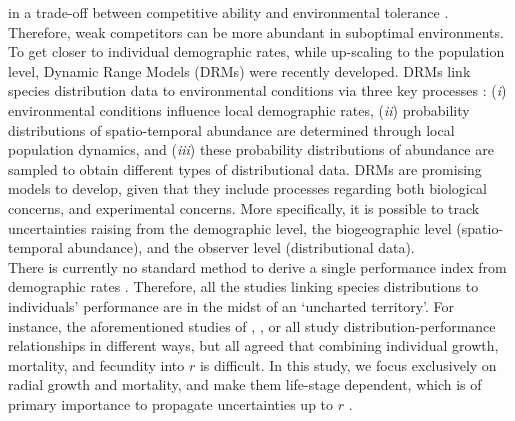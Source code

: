 in a trade-off between competitive ability and environmental tolerance
\citep{Serrano2015}. Therefore, weak competitors can be more abundant in
suboptimal environments.  To get closer to individual demographic rates,
while up-scaling to the population level, Dynamic Range Models (DRMs) were
recently developed. DRMs link species distribution data to environmental
conditions via three key processes \citep{Pagel2012}: (\textit{i})
environmental conditions influence local demographic rates, (\textit{ii})
probability distributions of spatio-temporal abundance are determined through local
population dynamics, and (\textit{iii}) these probability distributions of abundance are
sampled to obtain different types of distributional data. DRMs are promising
models to develop, given that they include processes regarding both biological
concerns, and experimental concerns. More specifically, it is possible to track uncertainties raising from the demographic level, the biogeographic level (spatio-temporal abundance), and the observer level (distributional data). \\

There is currently no standard method to derive a single performance index from demographic rates \citep{Purves2009}. Therefore, all the studies linking species distributions to individuals' performance are in the midst of an `uncharted territory'. For instance, the aforementioned studies of \citeauthor{McGill2012}, \citeauthor{Thuiller2014}, or \citeauthor{Pagel2012} all study distribution-performance relationships in different ways, but all agreed that combining individual growth, mortality, and fecundity into $ r $ is difficult. In this study, we focus exclusively on radial growth and mortality, and make them life-stage dependent, which is of primary importance to propagate uncertainties up to $ r $ \citep[$ \lambda $ in his article]{Clark2003b}. \\

